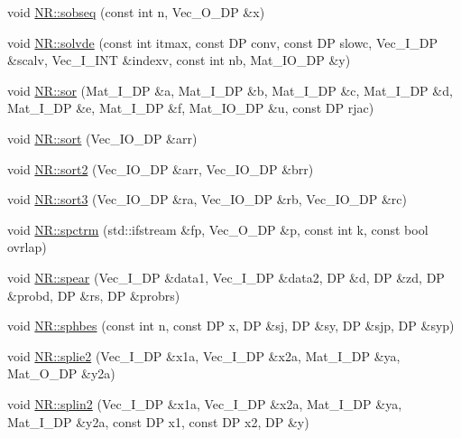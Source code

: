 \begin{DoxyCompactItemize}
void \mbox{\hyperlink{namespaceNR_a1357ef8a6e9ec8dd977c9280119cb41b}{N\+R\+::sobseq}} (const int n, Vec\+\_\+\+O\+\_\+\+DP \&x)
\item 
void \mbox{\hyperlink{namespaceNR_aed31ba4292a87797a7eef501659413d2}{N\+R\+::solvde}} (const int itmax, const DP conv, const DP slowc, Vec\+\_\+\+I\+\_\+\+DP \&scalv, Vec\+\_\+\+I\+\_\+\+I\+NT \&indexv, const int nb, Mat\+\_\+\+I\+O\+\_\+\+DP \&y)
\item 
void \mbox{\hyperlink{namespaceNR_a20465364d77d93fb2f8ec0a0aca6f509}{N\+R\+::sor}} (Mat\+\_\+\+I\+\_\+\+DP \&a, Mat\+\_\+\+I\+\_\+\+DP \&b, Mat\+\_\+\+I\+\_\+\+DP \&c, Mat\+\_\+\+I\+\_\+\+DP \&d, Mat\+\_\+\+I\+\_\+\+DP \&e, Mat\+\_\+\+I\+\_\+\+DP \&f, Mat\+\_\+\+I\+O\+\_\+\+DP \&u, const DP rjac)
\item 
void \mbox{\hyperlink{namespaceNR_a3cdf7710dd309ccdfedbf8a5cc6e3797}{N\+R\+::sort}} (Vec\+\_\+\+I\+O\+\_\+\+DP \&arr)
\item 
void \mbox{\hyperlink{namespaceNR_aac9ed2f59dae4ff79ef08dd3df8f3120}{N\+R\+::sort2}} (Vec\+\_\+\+I\+O\+\_\+\+DP \&arr, Vec\+\_\+\+I\+O\+\_\+\+DP \&brr)
\item 
void \mbox{\hyperlink{namespaceNR_aacbec42c43f9d847e5f0d00b9d978e99}{N\+R\+::sort3}} (Vec\+\_\+\+I\+O\+\_\+\+DP \&ra, Vec\+\_\+\+I\+O\+\_\+\+DP \&rb, Vec\+\_\+\+I\+O\+\_\+\+DP \&rc)
\item 
void \mbox{\hyperlink{namespaceNR_ae38cea9c6129763058f4b5acebd61ef8}{N\+R\+::spctrm}} (std\+::ifstream \&fp, Vec\+\_\+\+O\+\_\+\+DP \&p, const int k, const bool ovrlap)
\item 
void \mbox{\hyperlink{namespaceNR_a6bc9d94a243840f52c5520b6e963b9c1}{N\+R\+::spear}} (Vec\+\_\+\+I\+\_\+\+DP \&data1, Vec\+\_\+\+I\+\_\+\+DP \&data2, DP \&d, DP \&zd, DP \&probd, DP \&rs, DP \&probrs)
\item 
void \mbox{\hyperlink{namespaceNR_ab729e0038cdadb95f6f51d2a3d2844a2}{N\+R\+::sphbes}} (const int n, const DP x, DP \&sj, DP \&sy, DP \&sjp, DP \&syp)
\item 
void \mbox{\hyperlink{namespaceNR_a670845ceadb2a0b3d7196a9fad1ca893}{N\+R\+::splie2}} (Vec\+\_\+\+I\+\_\+\+DP \&x1a, Vec\+\_\+\+I\+\_\+\+DP \&x2a, Mat\+\_\+\+I\+\_\+\+DP \&ya, Mat\+\_\+\+O\+\_\+\+DP \&y2a)
\item 
void \mbox{\hyperlink{namespaceNR_a4021f8bd5baff21c01220d6fb12ddc63}{N\+R\+::splin2}} (Vec\+\_\+\+I\+\_\+\+DP \&x1a, Vec\+\_\+\+I\+\_\+\+DP \&x2a, Mat\+\_\+\+I\+\_\+\+DP \&ya, Mat\+\_\+\+I\+\_\+\+DP \&y2a, const DP x1, const DP x2, DP \&y)
\item 

\end{DoxyCompactItemize}
